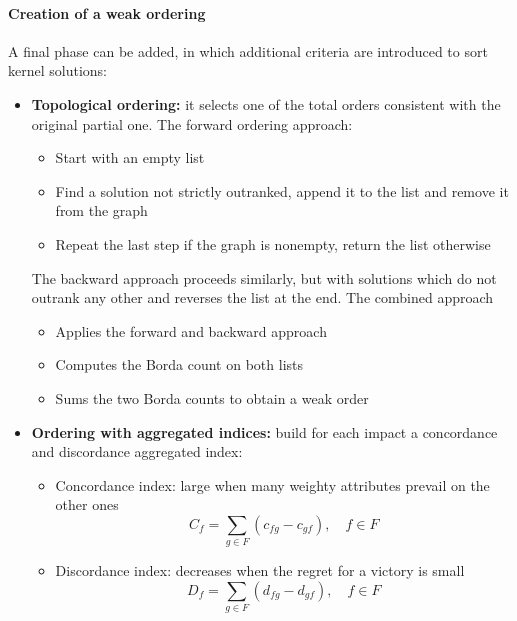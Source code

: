 \paragraph{Creation of a weak ordering} A final phase can be added, in which additional criteria are introduced to sort kernel solutions: 
\begin{itemize}
	\item \textbf{Topological ordering:} it selects one of the total orders consistent with the original partial one. The forward ordering approach:
	\begin{itemize}
		\item Start with an empty list
		
		\item Find a solution not strictly outranked, append it to the list and remove it from the graph
		
		\item Repeat the last step if the graph is nonempty, return the list otherwise
	\end{itemize}
	The backward approach proceeds similarly, but with solutions which do not outrank any other and reverses the list at the end. The combined approach
	\begin{itemize}
		\item Applies the forward and backward approach
		
		\item Computes the Borda count on both lists 
		
		\item Sums the two Borda counts to obtain a weak order
	\end{itemize}
	
	\item \textbf{Ordering with aggregated indices:} build for each impact a concordance and discordance aggregated index: 
	\begin{itemize}
		\item Concordance index: large when many weighty attributes prevail on the other ones
		$$ C_f = \sum_{g \in F} (c_{fg} - c_{gf}), \quad f \in F $$
		
		\item Discordance index: decreases when the regret for a victory is small
		$$ D_f = \sum_{g \in F} (d_{fg} - d_{gf}), \quad f \in F $$
	\end{itemize}
\end{itemize}